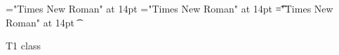 \font\vxt="Times New Roman" at 14pt
\font\xt="Times New Roman" at 14pt
\font\t="Times New Roman" at 14pt
\t{T1 class 

}
\bye
